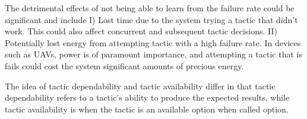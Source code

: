 \documentclass{article}
\newcommand{\dan}[1]{\textcolor{blue}{{\it [Dan says: #1]}}}
\begin{document}
\begin{enumerate}[noitemsep]
The detrimental effects of not being able to learn from the failure rate could be significant and include I) Lost time due to the system trying a tactic that didn't work. This could also affect concurrent and subsequent tactic decisions. II) Potentially lost energy from attempting tactic with a high failure rate. In devices such as UAVs, power is of paramount importance, and attempting a tactic that is fails could cost the system significant amounts of precious energy.


The idea of tactic dependability and tactic availability differ in that tactic dependability refers to a tactic's ability to produce the expected results, while tactic availability is when the tactic is an available option when called option. %



























\end{enumerate}
\end{document}
